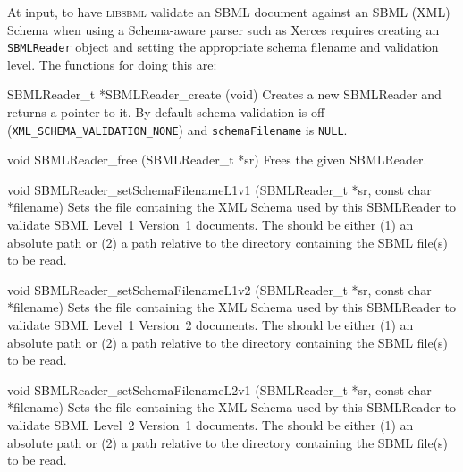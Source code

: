 \documentclass{sbmlmanual}
\newcommand{\libsbml}{\textsc{libsbml}}
\begin{document}
At input, to have \libsbml{} validate an SBML document against an SBML
(XML) Schema when using a Schema-aware parser such as Xerces requires
creating an \texttt{SBMLReader} object and setting the appropriate schema
filename and validation level.  The functions for doing this are:


\begin{methoddef}{SBMLReader\_t *SBMLReader\_create (void)}
  Creates a new SBMLReader and returns a pointer to it.  By default
  schema validation is off (\texttt{XML\_SCHEMA\_VALIDATION\_NONE})
  and \texttt{schemaFilename} is \texttt{NULL}.
\end{methoddef}


\begin{methoddef}{void SBMLReader\_free (SBMLReader\_t *sr)}
  Frees the given SBMLReader.
\end{methoddef}


\begin{methoddef}{void SBMLReader\_setSchemaFilenameL1v1 (SBMLReader\_t *sr, const char *filename)}
  Sets the file containing the XML Schema used by this SBMLReader to
  validate SBML Level~1 Version~1 documents.  The 
  should be either (1) an absolute path or (2) a path relative to the
  directory containing the SBML file(s) to be read.
\end{methoddef}


\begin{methoddef}{void SBMLReader\_setSchemaFilenameL1v2 (SBMLReader\_t *sr, const char *filename)}
  Sets the file containing the XML Schema used by this SBMLReader to
  validate SBML Level~1 Version~2 documents.  The 
  should be either (1) an absolute path or (2) a path relative to the
  directory containing the SBML file(s) to be read.
\end{methoddef}


\begin{methoddef}{void SBMLReader\_setSchemaFilenameL2v1 (SBMLReader\_t *sr, const char *filename)}
  Sets the file containing the XML Schema used by this SBMLReader to
  validate SBML Level~2 Version~1 documents.  The 
  should be either (1) an absolute path or (2) a path relative to the
  directory containing the SBML file(s) to be read.
\end{methoddef}
\end{document}
